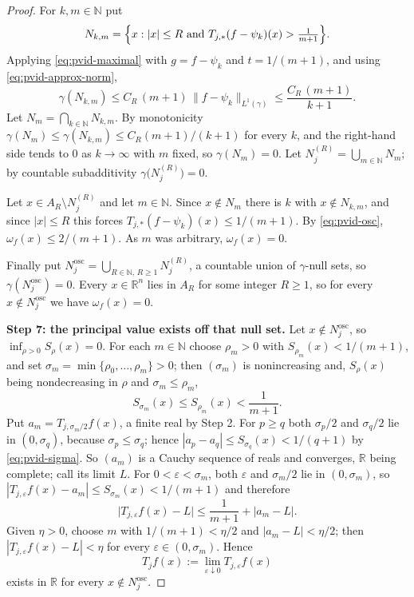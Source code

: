 \begin{proof}
For $k,m \in \mathbb{N}$ put
\[
  N_{k,m} = \Bigl\{x : |x| \leq R \text{ and }
     T_{j,*}(f-\psi_k)(x) > \tfrac1{m+1}\Bigr\} .
\]
Applying \eqref{eq:pvid-maximal} with $g = f - \psi_k$ and $t = 1/(m+1)$, and
using \eqref{eq:pvid-approx-norm},
\[
  \gamma(N_{k,m}) \leq C_R\,(m+1)\,\|f-\psi_k\|_{L^1(\gamma)}
     \leq \frac{C_R\,(m+1)}{k+1} .
\]
Let $N_m = \bigcap_{k\in\mathbb{N}}N_{k,m}$.  By monotonicity
$\gamma(N_m) \leq \gamma(N_{k,m}) \leq C_R(m+1)/(k+1)$ for every $k$, and the
right-hand side tends to $0$ as $k \to \infty$ with $m$ fixed, so
$\gamma(N_m) = 0$.  Let $N^{(R)}_j = \bigcup_{m\in\mathbb{N}}N_m$; by countable
subadditivity $\gamma\bigl(N^{(R)}_j\bigr) = 0$.

Let $x \in A_R \setminus N^{(R)}_j$ and let $m \in \mathbb{N}$.  Since
$x \notin N_m$ there is $k$ with $x \notin N_{k,m}$, and since $|x| \leq R$
this forces $T_{j,*}(f-\psi_k)(x) \leq 1/(m+1)$.  By \eqref{eq:pvid-osc},
$\omega_f(x) \leq 2/(m+1)$.  As $m$ was arbitrary, $\omega_f(x) = 0$.

Finally put $N_j^{\mathrm{osc}} = \bigcup_{R\in\mathbb{N},\,R\geq1}N^{(R)}_j$,
a countable union of $\gamma$-null sets, so $\gamma(N_j^{\mathrm{osc}}) = 0$.
Every $x \in \mathbb{R}^n$ lies in $A_R$ for some integer $R \geq 1$, so for
every $x \notin N_j^{\mathrm{osc}}$ we have $\omega_f(x) = 0$.

\medskip
\noindent\textbf{Step 7: the principal value exists off that null set.}
Let $x \notin N_j^{\mathrm{osc}}$, so $\inf_{\rho>0}S_\rho(x) = 0$.  For each
$m \in \mathbb{N}$ choose $\rho_m > 0$ with $S_{\rho_m}(x) < 1/(m+1)$, and set
$\sigma_m = \min\{\rho_0,\ldots,\rho_m\} > 0$; then $(\sigma_m)$ is
nonincreasing and, $S_\rho(x)$ being nondecreasing in $\rho$ and
$\sigma_m \leq \rho_m$,
\begin{equation}\label{eq:pvid-sigma}
  S_{\sigma_m}(x) \leq S_{\rho_m}(x) < \frac1{m+1} .
\end{equation}
Put $a_m = T_{j,\sigma_m/2}f(x)$, a finite real by Step 2.  For $p \geq q$ both
$\sigma_p/2$ and $\sigma_q/2$ lie in $(0,\sigma_q)$, because
$\sigma_p \leq \sigma_q$; hence $|a_p - a_q| \leq S_{\sigma_q}(x) < 1/(q+1)$ by
\eqref{eq:pvid-sigma}.  So $(a_m)$ is a Cauchy sequence of reals and converges,
$\mathbb{R}$ being complete; call its limit $L$.  For $0 < \varepsilon <
\sigma_m$, both $\varepsilon$ and $\sigma_m/2$ lie in $(0,\sigma_m)$, so
$|T_{j,\varepsilon}f(x) - a_m| \leq S_{\sigma_m}(x) < 1/(m+1)$ and therefore
\[
  \bigl|T_{j,\varepsilon}f(x) - L\bigr| \leq \frac1{m+1} + |a_m - L| .
\]
Given $\eta > 0$, choose $m$ with $1/(m+1) < \eta/2$ and $|a_m - L| < \eta/2$;
then $|T_{j,\varepsilon}f(x) - L| < \eta$ for every
$\varepsilon \in (0,\sigma_m)$.  Hence
\begin{equation}\label{eq:pvid-limit}
  T_jf(x) := \lim_{\varepsilon\downarrow0}T_{j,\varepsilon}f(x)
\end{equation}
exists in $\mathbb{R}$ for every $x \notin N_j^{\mathrm{osc}}$.


\end{proof}
